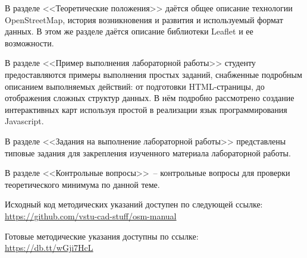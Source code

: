 \documentclass[a4paper, 14pt]{extreport}
\begin{document}
    В разделе <<Теоретические положения>> даётся общее описание технологии
    OpenStreetMap, история возникновения и развития и используемый формат
    данных. В этом же разделе даётся описание библиотеки Leaflet и ее
    возможности.

    В разделе <<Пример выполнения лабораторной работы>> студенту
    предоставляются примеры выполнения простых заданий, снабженные подробным
    описанием выполняемых действий: от подготовки HTML-страницы, до отображения
    сложных структур данных. В нём подробно рассмотрено создание интерактивных
    карт используя простой в реализации язык программирования Javascript.

    В разделе <<Задания на выполнение лабораторной работы>> представлены
    типовые задания для закрепления изученного материала лабораторной работы.

    В разделе <<Контрольные вопросы>>~-- контрольные вопросы для проверки
    теоретического минимума по данной теме.
    
    Исходный код методических указаний доступен по следующей ссылке:\\
    \url{https://github.com/vstu-cad-stuff/osm-manual}
    
    Готовые методические указания доступны по ссылке:\\
    \url{https://db.tt/wGji7HcL} 
\end{document}
